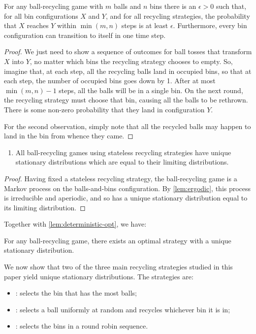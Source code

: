 \begin{lemma}\label{lem:ergodic}
	For any ball-recycling game with $m$ balls and $n$ bins there is an
	$\epsilon>0$ such that, for all bin configurations $X$ and $Y$, and for all
	recycling strategies, the probability that $X$ reaches $Y$ within
	$\min(m,n)$ steps is at least $\epsilon$.  Furthermore, every bin
	configuration can transition to itself in one time step.
\end{lemma}
\begin{proof}
	We just need to show a sequence of outcomes for ball tosses that transform
	$X$ into $Y$, no matter which bins the recycling strategy chooses to empty.
	So, imagine that, at each step, all the recycling balls land in occupied
	bins, so that at each step, the number of occupied bins goes down by 1.
	After at most $\min(m,n)-1$ steps, all the balls will be in a single bin.
	On the next round, the recycling strategy must choose that bin, causing all
	the balls to be rethrown.  There is some non-zero probability that they
	land in configuration $Y$.

	For the second observation, simply note that all the recycled balls may
	happen to land in the bin from whence they came.
\end{proof}

\begin{lemma} \label{lem:stationary}
	\leavevmode
	\begin{enumerate}
	\item All ball-recycling games using stateless recycling strategies have
		unique stationary distributions which are equal to their limiting
		distributions.
  \end{enumerate}
\end{lemma}
\begin{proof}
	Having fixed a stateless recycling strategy, the ball-recycling game is a
	Markov process on the balls-and-bins configuration. By
	\cref{lem:ergodic}, this process is irreducible and aperiodic, and so
	has a unique stationary distribution equal to its limiting distribution.
\end{proof}

Together with \cref{lem:deterministic-opt}, we have:
\begin{corollary} \label{cor:opt-unique}
	For any ball-recycling game, there exists an optimal strategy with a unique
	stationary distribution.
\end{corollary}

We now show that two of the three main recycling strategies studied in this
paper yield unique stationary distributions.  The strategies are:
\begin{itemize}
\item \FB: selects the bin that has the most balls;
\item \RB: selects a ball uniformly at random and recycles whichever bin it is in;
\item \GG: selects the bins in a round robin sequence.
\end{itemize}

